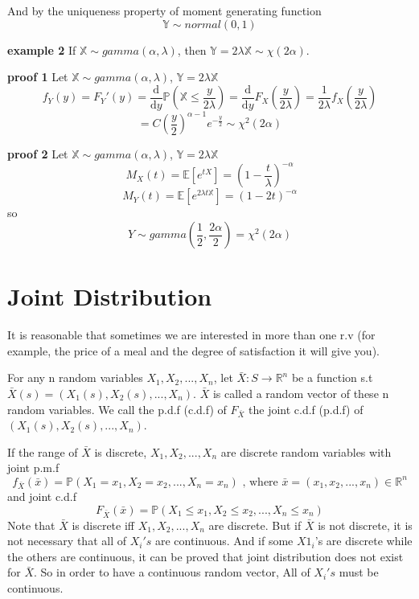 \documentclass[a4paper,12pt]{article}
\begin{document}
And by the uniqueness property of moment generating function
$$\mathbb{Y} \sim normal(0, 1)$$

\textbf{example 2}
If $\mathbb{X} \sim gamma(\alpha, \lambda)$, then $\mathbb{Y} = 2 \lambda \mathbb{X} \sim \chi(2 \alpha)$. 

\textbf{proof 1}
Let $\mathbb{X} \sim gamma(\alpha, \lambda)$,  $\mathbb{Y} = 2 \lambda \mathbb{X}$
$$f_Y(y) = F_Y'(y) = \frac{\mathrm{d}}{\mathrm{d}y} \mathbb{P}( \mathbb{X} \leq \frac{y}{2 \lambda} ) = \frac{\mathrm{d}}{\mathrm{d}y} F_X( \frac{y}{2 \lambda} ) = \frac{1}{2 \lambda} f_X( \frac{y}{2 \lambda} )$$
$$= C (\frac{y}{2})^{\alpha-1} e^{-\frac{y}{2}} \sim \chi^2(2\alpha)$$

\textbf{proof 2}
Let $\mathbb{X} \sim gamma(\alpha, \lambda)$,  $\mathbb{Y} = 2 \lambda \mathbb{X}$
$$M_X(t) = \mathbb{E}[e^{tX}] = (1-\frac{t}{\lambda} )^{-\alpha}$$
$$M_Y(t) = \mathbb{E}[e^{2 \lambda t \mathbb{X}}] = (1-2 t)^{-\alpha}$$
so
$$Y \sim gamma(\frac{1}{2}, \frac{2\alpha}{2}) = \chi^2(2\alpha)$$


\newpage
\section{Joint Distribution}
It is reasonable that sometimes we are interested in more than one r.v (for example, the price of a meal and the degree of satisfaction it will give you). 

For any n random variables $X_1, X_2, ..., X_n$, let $\bar{X} : S \to \mathbb{R}^n$ be a function s.t $\bar{X}(s) = (X_1(s), X_2(s), ..., X_n)$.  $\bar{X}$ is called a random vector of these n random variables. We call the p.d.f (c.d.f) of $F_{\bar{X}}$ the joint c.d.f (p.d.f) of $(X_1(s), X_2(s), ..., X_n)$.

If the range of $\bar{X}$ is discrete, $X_1, X_2, ..., X_n$ are discrete random variables with joint p.m.f
$$f_{\bar{X}}(\bar{x}) = \mathbb{P}( X_1 = x_1, X_2 = x_2, ..., X_n = x_n )\text{ , where }\bar{x} = (x_1, x_2, ..., x_n) \in \mathbb{R}^n $$
and joint c.d.f
$$F_{\bar{X}}(\bar{x}) = \mathbb{P}( X_1 \leq x_1, X_2 \leq x_2, ..., X_n \leq x_n )$$
Note that $\bar{X}$ is discrete iff $X_1, X_2, ..., X_n$ are discrete. But if $\bar{X}$ is not discrete, it is not necessary that all of $X_i's$ are continuous. And if some $X1_i$'s are discrete while the others are continuous, it can be proved that joint distribution does not exist for $\bar{X}$. So in order to have a continuous random vector, All of $X_i's$ must be continuous.
\end{document}
